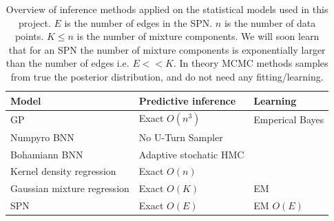 \begin{table}[H]
    \centering
    \begin{tabular}{l|l|l}
    \textbf{Model}       & \textbf{Predictive inference}    &   \textbf{Learning} \\ \hline
    GP                          & Exact $O(n^3)$            & Emperical Bayes\\
    Numpyro BNN                 & No U-Turn Sampler         & \\
    Bohamiann BNN               & Adaptive stochatic HMC    & \\
    Kernel density regression   & Exact $O(n)$              & \\
    Gaussian mixture regression & Exact $O(K)$              & EM  \\
    SPN                         & Exact $O(E)$              &  EM $O(E)$\\
    \end{tabular}
    \caption{Overview of inference methods applied on the statistical models used in this project.
            $E$ is the number of edges in the SPN. $n$ is the number of data points. $K \leq n$ is
            the number of mixture components. We will soon learn that for an SPN the number of
            mixture components is exponentially larger than the number of edges i.e. $E << K$. In theory
            MCMC methods samples from true the posterior distribution, and do not need any
            fitting/learning. }
\end{table}

\newpage
